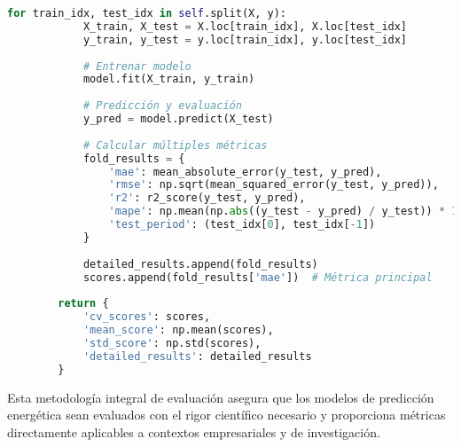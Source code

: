 \begin{lstlisting}[language=Python, caption=Validación cruzada temporal específica]
        for train_idx, test_idx in self.split(X, y):
            X_train, X_test = X.loc[train_idx], X.loc[test_idx]
            y_train, y_test = y.loc[train_idx], y.loc[test_idx]
            
            # Entrenar modelo
            model.fit(X_train, y_train)
            
            # Predicción y evaluación
            y_pred = model.predict(X_test)
            
            # Calcular múltiples métricas
            fold_results = {
                'mae': mean_absolute_error(y_test, y_pred),
                'rmse': np.sqrt(mean_squared_error(y_test, y_pred)),
                'r2': r2_score(y_test, y_pred),
                'mape': np.mean(np.abs((y_test - y_pred) / y_test)) * 100,
                'test_period': (test_idx[0], test_idx[-1])
            }
            
            detailed_results.append(fold_results)
            scores.append(fold_results['mae'])  # Métrica principal
        
        return {
            'cv_scores': scores,
            'mean_score': np.mean(scores),
            'std_score': np.std(scores),
            'detailed_results': detailed_results
        }
\end{lstlisting}

Esta metodología integral de evaluación asegura que los modelos de predicción energética sean evaluados con el rigor científico necesario y proporciona métricas directamente aplicables a contextos empresariales y de investigación.
